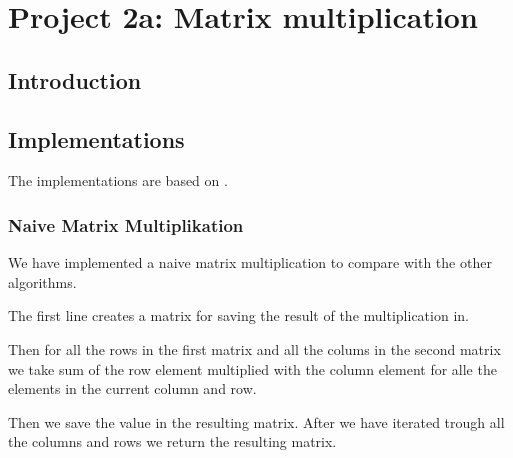 
\chapter{Project 2a: Matrix multiplication} %

\label{Chapter2} %




\section{Introduction}



\section{Implementations}
The implementations are based on \citep{matrixMultiplication}.

\subsection{Naive Matrix Multiplikation}
We have implemented a naive matrix multiplication to compare with the other algorithms.

The first line creates a matrix for saving the result of the multiplication in.

Then for all the rows in the first matrix and all the colums in the second matrix we take sum of the row element multiplied with the column element for alle the elements in the current column and row.

Then we save the value in the resulting matrix.
After we have iterated trough all the columns and rows we return the resulting matrix.


